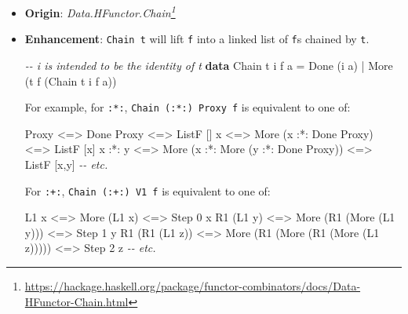 \documentclass[]{article}
\newenvironment{Shaded}{}{}
\newcommand{\CommentTok}[1]{\textcolor[rgb]{0.38,0.63,0.69}{\textit{#1}}}
\newcommand{\DataTypeTok}[1]{\textcolor[rgb]{0.56,0.13,0.00}{#1}}
\newcommand{\DecValTok}[1]{\textcolor[rgb]{0.25,0.63,0.44}{#1}}
\newcommand{\KeywordTok}[1]{\textcolor[rgb]{0.00,0.44,0.13}{\textbf{#1}}}
\newcommand{\NormalTok}[1]{#1}
\newcommand{\OperatorTok}[1]{\textcolor[rgb]{0.40,0.40,0.40}{#1}}
\newcommand{\OtherTok}[1]{\textcolor[rgb]{0.00,0.44,0.13}{#1}}
\renewcommand{\href}[2]{#2\footnote{\url{#1}}}
\begin{document}
\begin{itemize}
\item
  \textbf{Origin}:
  \emph{\href{https://hackage.haskell.org/package/functor-combinators/docs/Data-HFunctor-Chain.html}{Data.HFunctor.Chain}}
\item
  \textbf{Enhancement}: \texttt{Chain\ t} will lift \texttt{f} into a linked
  list of \texttt{f}s chained by \texttt{t}.

\begin{Shaded}
\begin{Highlighting}[]
\CommentTok{{-}{-} i is intended to be the identity of t}
\KeywordTok{data} \DataTypeTok{Chain}\NormalTok{ t i f a }\OtherTok{=} \DataTypeTok{Done}\NormalTok{ (i a)}
                   \OperatorTok{|} \DataTypeTok{More}\NormalTok{ (t f (}\DataTypeTok{Chain}\NormalTok{ t i f a))}
\end{Highlighting}
\end{Shaded}

  For example, for \texttt{:*:}, \texttt{Chain\ (:*:)\ Proxy\ f} is equivalent
  to one of:

\begin{Shaded}
\begin{Highlighting}[]
\DataTypeTok{Proxy}   \OperatorTok{<=>} \DataTypeTok{Done} \DataTypeTok{Proxy}                           \OperatorTok{<=>} \DataTypeTok{ListF}\NormalTok{ []}
\NormalTok{x       }\OperatorTok{<=>} \DataTypeTok{More}\NormalTok{ (x }\OperatorTok{:*:} \DataTypeTok{Done} \DataTypeTok{Proxy}\NormalTok{)              }\OperatorTok{<=>} \DataTypeTok{ListF}\NormalTok{ [x]}
\NormalTok{x }\OperatorTok{:*:}\NormalTok{ y }\OperatorTok{<=>} \DataTypeTok{More}\NormalTok{ (x }\OperatorTok{:*:} \DataTypeTok{More}\NormalTok{ (y }\OperatorTok{:*:} \DataTypeTok{Done} \DataTypeTok{Proxy}\NormalTok{)) }\OperatorTok{<=>} \DataTypeTok{ListF}\NormalTok{ [x,y]}
\CommentTok{{-}{-} etc.}
\end{Highlighting}
\end{Shaded}

  For \texttt{:+:}, \texttt{Chain\ (:+:)\ V1\ f} is equivalent to one of:

\begin{Shaded}
\begin{Highlighting}[]
\DataTypeTok{L1}\NormalTok{ x           }\OperatorTok{<=>} \DataTypeTok{More}\NormalTok{ (}\DataTypeTok{L1}\NormalTok{ x)                         }\OperatorTok{<=>} \DataTypeTok{Step} \DecValTok{0}\NormalTok{ x}
\DataTypeTok{R1}\NormalTok{ (}\DataTypeTok{L1}\NormalTok{ y)      }\OperatorTok{<=>} \DataTypeTok{More}\NormalTok{ (}\DataTypeTok{R1}\NormalTok{ (}\DataTypeTok{More}\NormalTok{ (}\DataTypeTok{L1}\NormalTok{ y)))             }\OperatorTok{<=>} \DataTypeTok{Step} \DecValTok{1}\NormalTok{ y}
\DataTypeTok{R1}\NormalTok{ (}\DataTypeTok{R1}\NormalTok{ (}\DataTypeTok{L1}\NormalTok{ z)) }\OperatorTok{<=>} \DataTypeTok{More}\NormalTok{ (}\DataTypeTok{R1}\NormalTok{ (}\DataTypeTok{More}\NormalTok{ (}\DataTypeTok{R1}\NormalTok{ (}\DataTypeTok{More}\NormalTok{ (}\DataTypeTok{L1}\NormalTok{ z))))) }\OperatorTok{<=>} \DataTypeTok{Step} \DecValTok{2}\NormalTok{ z}
\CommentTok{{-}{-} etc.}
\end{Highlighting}
\end{Shaded}


\end{itemize}
\end{document}
